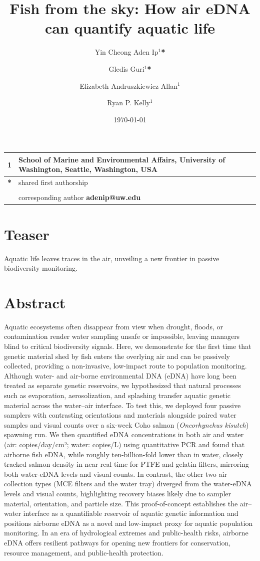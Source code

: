 \documentclass{article}
\title{Fish from the sky: How air eDNA can quantify aquatic life}
\author{Yin Cheong Aden Ip$^1$\textbf{*} \and
Gledis Guri$^1$\textbf{*} \and
Elizabeth Andruszkiewicz Allan$^1$ \and
Ryan P. Kelly$^1$}
\date{\today}
\begin{document}
\maketitle

\section*{}

\begin{center}
\begin{tabular}{ll}
1 & School of Marine and Environmental Affairs, University of Washington, Seattle, Washington, USA \\
\hline
\textbf{*} & shared first authorship\\
&\\
& corresponding author \textbf{adenip@uw.edu}
\end{tabular}
\end{center}

\section*{Teaser}
Aquatic life leaves traces in the air, unveiling a new frontier in passive biodiversity monitoring.

\section*{Abstract}
Aquatic ecosystems often disappear from view when drought, floods, or contamination render water sampling unsafe or impossible, leaving managers blind to critical biodiversity signals.  Here, we demonstrate for the first time that genetic material shed by fish enters the overlying air and can be passively collected, providing a non-invasive, low-impact route to population monitoring. Although water- and air-borne environmental DNA (eDNA) have long been treated as separate genetic reservoirs, we hypothesized that natural processes such as evaporation, aerosolization, and splashing transfer aquatic genetic material across the water–air interface. To test this, we deployed four passive samplers with contrasting orientations and materials alongside paired water samples and visual counts over a six-week Coho salmon (\textit{Oncorhynchus kisutch}) spawning run. We then quantified eDNA concentrations in both air and water  (air: copies/day/cm²; water: copies/L) using quantitative PCR and found that airborne fish eDNA, while roughly ten-billion-fold lower than in water, closely tracked salmon density in near real time for PTFE and gelatin filters, mirroring both water-eDNA levels and visual counts. In contrast, the other two air collection types (MCE filters and the water tray) diverged from the water-eDNA levels and visual counts, highlighting recovery biases likely due to sampler material, orientation, and particle size. This proof-of-concept establishes the air–water interface as a quantifiable reservoir of aquatic genetic information and positions airborne eDNA as a novel and low-impact proxy for aquatic population monitoring. In an era of hydrological extremes and public-health risks, airborne eDNA offers resilient pathways for opening new frontiers for conservation, resource management, and public-health protection.
\end{document}
